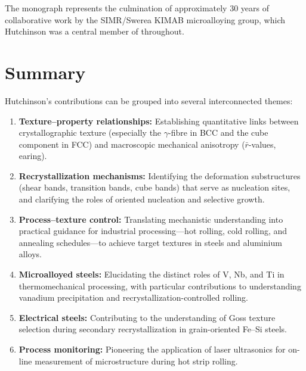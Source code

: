 \documentclass[11pt,a4paper]{article}
\begin{document}
The monograph represents the culmination of approximately 30 years of
collaborative work by the SIMR/Swerea KIMAB microalloying group,
which Hutchinson was a central member of throughout.

\section*{Summary}

Hutchinson's contributions can be grouped into several interconnected themes:

\begin{enumerate}
  \item \textbf{Texture--property relationships:} Establishing
    quantitative links between crystallographic texture (especially the
    $\gamma$-fibre in BCC and the cube component in FCC) and
    macroscopic mechanical anisotropy ($\bar{r}$-values, earing).

  \item \textbf{Recrystallization mechanisms:} Identifying the
    deformation substructures (shear bands, transition bands,
    cube bands) that serve as nucleation sites, and clarifying the
    roles of oriented nucleation and selective growth.

  \item \textbf{Process--texture control:} Translating mechanistic
    understanding into practical guidance for industrial processing---hot
    rolling, cold rolling, and annealing schedules---to achieve target
    textures in steels and aluminium alloys.

  \item \textbf{Microalloyed steels:} Elucidating the distinct roles of
    V, Nb, and Ti in thermomechanical processing, with particular
    contributions to understanding vanadium precipitation and
    recrystallization-controlled rolling.

  \item \textbf{Electrical steels:} Contributing to the understanding of
    Goss texture selection during secondary recrystallization in
    grain-oriented Fe--Si steels.

  \item \textbf{Process monitoring:} Pioneering the application of laser
    ultrasonics for on-line measurement of microstructure during hot
    strip rolling.
\end{enumerate}
\end{document}
